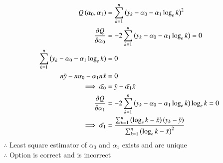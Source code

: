 \documentclass[journal,12pt,onecolumn]{IEEEtran}
\theoremstyle{remark}
\begin{document}
\begin{enumerate}
\begin{table}[!htb]
	\label{table_gate23_st_26}
\end{table}
\begin{align}
	Q\brak{\alpha_{0},\alpha_{1}} &=  \sum_{k = 1}^{n} \brak{y_{k}-\alpha_{0}-\alpha_{1} \log_{e}k}^2\\
\frac{\partial Q}{\partial \alpha_{0}} &= -2 \sum_{k = 1}^{n} \brak{y_{k}-\alpha_{0}-\alpha_{1} \log_{e}k} = 0\\
	\sum_{k = 1}^{n} \brak{y_{k}-\alpha_{0}-\alpha_{1} \log_{e}k} &= 0\\
	n\bar{y} - n\alpha_{0} - \alpha_{1}n\bar{x} &= 0 \\%
	\implies \tilde{\alpha_{0}} &= \bar{y} - \tilde{\alpha_{1}}\bar{x}\\
	\frac{\partial Q}{\partial \alpha_{1}} &= -2 \sum_{k = 1}^{n} \brak{y_{k}-\alpha_{0}-\alpha_{1} \log_{e}k}\log_{e}k = 0\\
	\implies \tilde{\alpha_{1}} &= \frac{\sum_{k = 1}^{n}\brak{\log_{e}k-\bar{x}}\brak{y_{k}-\bar{y}}}{\sum_{k = 1}^{n}\brak{\log_{e}k-\bar{x}}^2}
\end{align}
$\therefore$ Least square estimator of $\alpha_{0}$ and $\alpha_{1}$ exists and are unique\\
$\therefore$ Option  is correct and  is incorrect\\
\end{enumerate}
\end{document}
